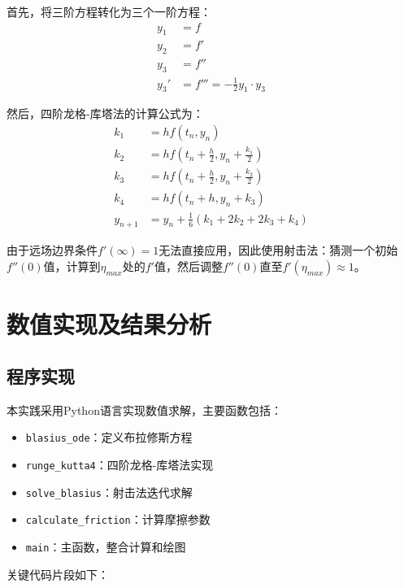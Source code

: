 \documentclass[12pt,a4paper]{article}
\begin{document}
首先，将三阶方程转化为三个一阶方程：
\begin{align}
y_1 &= f \\
y_2 &= f' \\
y_3 &= f'' \\
y_3' &= f''' = -\frac{1}{2}y_1 \cdot y_3
\end{align}

然后，四阶龙格-库塔法的计算公式为：
\begin{align}
k_1 &= hf(t_n, y_n) \\
k_2 &= hf(t_n+\frac{h}{2}, y_n+\frac{k_1}{2}) \\
k_3 &= hf(t_n+\frac{h}{2}, y_n+\frac{k_2}{2}) \\
k_4 &= hf(t_n+h, y_n+k_3) \\
y_{n+1} &= y_n + \frac{1}{6}(k_1 + 2k_2 + 2k_3 + k_4)
\end{align}

\begin{sloppypar}
由于远场边界条件$f'(\infty) = 1$无法直接应用，因此使用射击法：猜测一个初始$f''(0)$值，计算到$\eta_{max}$处的$f'$值，然后调整$f''(0)$直至$f'(\eta_{max}) \approx 1$。
\end{sloppypar}




\section{数值实现及结果分析}
\subsection{程序实现}
本实践采用Python语言实现数值求解，主要函数包括：
\begin{itemize}
    \item \texttt{blasius\_ode}：定义布拉修斯方程
    \item \texttt{runge\_kutta4}：四阶龙格-库塔法实现
    \item \texttt{solve\_blasius}：射击法迭代求解
    \item \texttt{calculate\_friction}：计算摩擦参数
    \item \texttt{main}：主函数，整合计算和绘图
\end{itemize}

关键代码片段如下：
\end{document}
